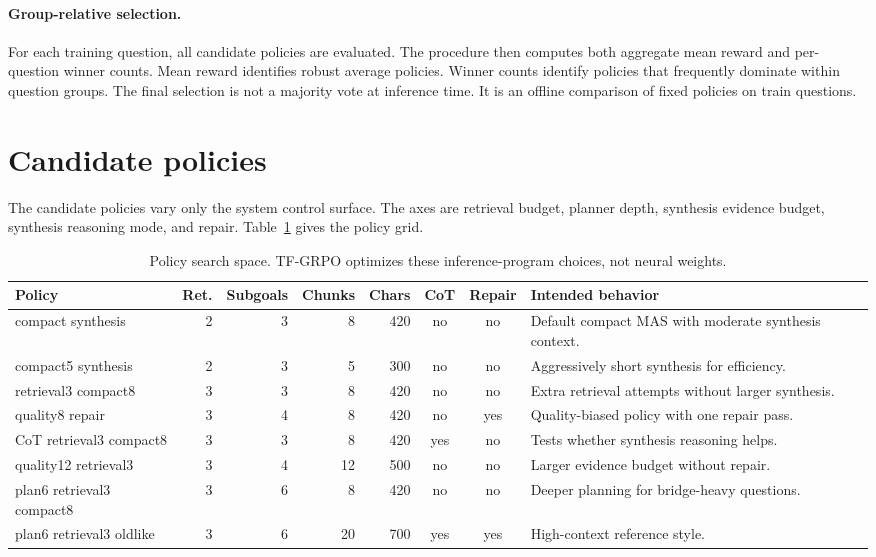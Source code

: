 \documentclass[10pt]{article}
\begin{document}
\paragraph{Group-relative selection.}
For each training question, all candidate policies are evaluated. The procedure then computes both aggregate mean reward and per-question winner counts. Mean reward identifies robust average policies. Winner counts identify policies that frequently dominate within question groups. The final selection is not a majority vote at inference time. It is an offline comparison of fixed policies on train questions.

\section{Candidate policies}

The candidate policies vary only the system control surface. The axes are retrieval budget, planner depth, synthesis evidence budget, synthesis reasoning mode, and repair. Table~\ref{tab:policies} gives the policy grid.

\begin{table}[H]
\centering
\small
\begin{tabular}{lrrrrccp{4.8cm}}
\toprule
Policy & Ret. & Subgoals & Chunks & Chars & CoT & Repair & Intended behavior \\
\midrule
compact synthesis & 2 & 3 & 8 & 420 & no & no & Default compact MAS with moderate synthesis context. \\
compact5 synthesis & 2 & 3 & 5 & 300 & no & no & Aggressively short synthesis for efficiency. \\
retrieval3 compact8 & 3 & 3 & 8 & 420 & no & no & Extra retrieval attempts without larger synthesis. \\
quality8 repair & 3 & 4 & 8 & 420 & no & yes & Quality-biased policy with one repair pass. \\
CoT retrieval3 compact8 & 3 & 3 & 8 & 420 & yes & no & Tests whether synthesis reasoning helps. \\
quality12 retrieval3 & 3 & 4 & 12 & 500 & no & no & Larger evidence budget without repair. \\
plan6 retrieval3 compact8 & 3 & 6 & 8 & 420 & no & no & Deeper planning for bridge-heavy questions. \\
plan6 retrieval3 oldlike & 3 & 6 & 20 & 700 & yes & yes & High-context reference style. \\
\bottomrule
\end{tabular}
\caption{Policy search space. TF-GRPO optimizes these inference-program choices, not neural weights.}
\label{tab:policies}
\end{table}
\end{document}
